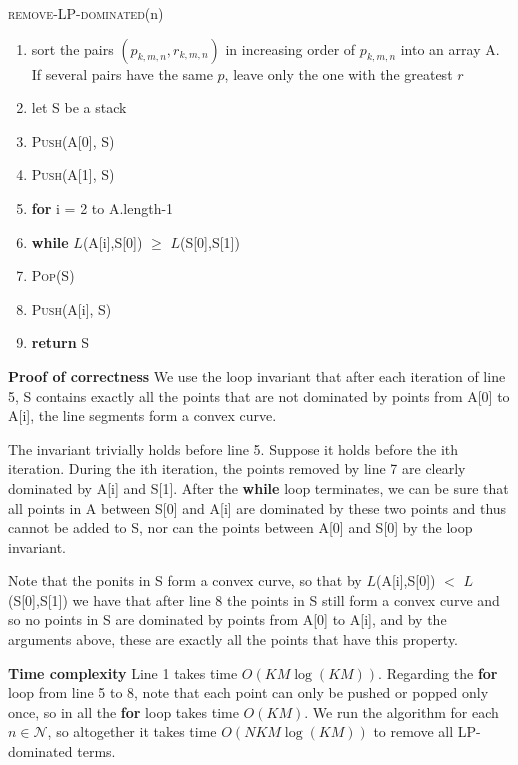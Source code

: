 \documentclass[10pt, oneside]{report}
\begin{document}
\noindent\textsc{remove-LP-dominated}(n)
\begin{enumerate}[1\ ]
\setlength{\topsep}{0.05ex}
\setlength{\itemsep}{0.05ex}
\item sort the pairs $(p_{k,m,n}, r_{k,m,n})$ in increasing order of $p_{k,m,n}$ into an array A. If several pairs have the same $p$, leave only the one with the greatest $r$
\item let S be a stack
\item \textsc{Push}(A[0], S)
\item \textsc{Push}(A[1], S)
\item \textbf{for} i = 2 to A.length-1
\item \qquad \textbf{while} $L$(A[i],S[0]) $\ge$ $L$(S[0],S[1])
\item \qquad \qquad\textsc{Pop}(S)
\item \qquad \textsc{Push}(A[i], S)
\item \textbf{return} S
\end{enumerate}

\noindent\textbf{Proof of correctness} We use the loop invariant that after each iteration of line 5, S contains exactly all the points that are not dominated by points from A[0] to A[i], the line segments form a convex curve.

The invariant trivially holds before line 5. Suppose it holds before the ith iteration. During the ith iteration, the points removed by line 7 are clearly dominated by A[i] and S[1]. After the \textbf{while} loop terminates, we can be sure that all points in A between S[0] and A[i] are dominated by these two points and thus cannot be added to S, nor can the points between A[0] and S[0] by the loop invariant.

Note that the ponits in S form a convex curve, so that by $L$(A[i],S[0]) $<$ $L$(S[0],S[1]) we have that after line 8 the points in S still form a convex curve and so no points in S are dominated by points from A[0] to A[i], and by the arguments above, these are exactly all the points that have this property.

\hspace{1em}

\noindent\textbf{Time complexity} Line 1 takes time $O(KM\log(KM))$. Regarding the \textbf{for} loop from line 5 to 8, note that each point can only be pushed or popped only once, so in all the \textbf{for} loop takes time $O(KM)$. We run the algorithm for each $n\in\mathcal{N}$, so altogether it takes time $O(NKM\log(KM))$ to remove all LP-dominated terms.
\end{document}
